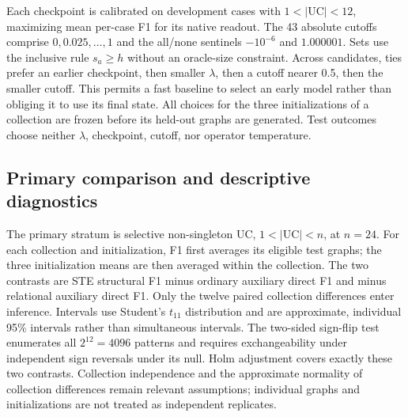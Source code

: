 Each checkpoint is calibrated on development cases with $1<|\mathrm{UC}|<12$, maximizing mean per-case F1 for its native readout. The 43 absolute cutoffs comprise $0,0.025,\ldots,1$ and the all/none sentinels $-10^{-6}$ and $1.000001$. Sets use the inclusive rule $s_a\ge h$ without an oracle-size constraint. Across candidates, ties prefer an earlier checkpoint, then smaller $\lambda$, then a cutoff nearer 0.5, then the smaller cutoff. This permits a fast baseline to select an early model rather than obliging it to use its final state. All choices for the three initializations of a collection are frozen before its held-out graphs are generated. Test outcomes choose neither $\lambda$, checkpoint, cutoff, nor operator temperature.

\subsection{Primary comparison and descriptive diagnostics}
The primary stratum is selective non-singleton UC, $1<|\mathrm{UC}|<n$, at $n=24$. For each collection and initialization, F1 first averages its eligible test graphs; the three initialization means are then averaged within the collection. The two contrasts are STE structural F1 minus ordinary auxiliary direct F1 and minus relational auxiliary direct F1. Only the twelve paired collection differences enter inference. Intervals use Student's $t_{11}$ distribution and are approximate, individual 95\% intervals rather than simultaneous intervals. The two-sided sign-flip test enumerates all $2^{12}=4096$ patterns and requires exchangeability under independent sign reversals under its null. Holm adjustment covers exactly these two contrasts. Collection independence and the approximate normality of collection differences remain relevant assumptions; individual graphs and initializations are not treated as independent replicates.

\begin{table}[ht]\centering\small

\caption{Complete-system UC follow-up. Each method uses its own development-selected native readout. All-class F1 uses the natural mixture; selective columns restrict to $1<|\mathrm{UC}|<n$. Exact is complete-set recovery and selected size is predicted cardinality on that stratum. Means average graphs, then three initializations, then twelve collections. Only $n=24$ selective F1 is primary.}
\label{tab:uc-equalcompute-systems}\end{table}

